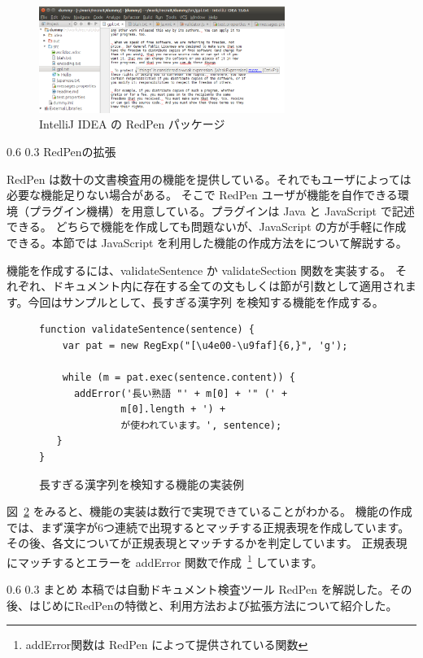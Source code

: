 \documentclass[a4j,twocolumn]{jarticle}
\makeatletter
\def\section{\@startsection{section}{1}{\z@}%
   {0.6\Cvs}%
   {0.3\Cvs}%
   {\reset@font\fontsize{10.5pt}{0pt}\bfseries}}
\makeatother
\begin{document}
\begin{figure}[thbp]
  \begin{center}
    \includegraphics[width=8cm]{figs/intellij.eps}
  \end{center}
  \caption{IntelliJ IDEA の RedPen パッケージ}
  \label{fig:intellij-idea}
\end{figure}  

\section{RedPenの拡張}
\label{sec:extension}

RedPen は数十の文書検査用の機能を提供している。それでもユーザによっては必要な機能足りない場合がある。
そこで RedPen ユーザが機能を自作できる環境（プラグイン機構）を用意している。プラグインは Java と JavaScript で記述できる。
どちらで機能を作成しても問題ないが、JavaScript の方が手軽に作成できる。本節では JavaScript を利用した機能の作成方法をについて解説する。

機能を作成するには、validateSentence か validateSection 関数を実装する。
それぞれ、ドキュメント内に存在する全ての文もしくは節が引数として適用されます。今回はサンプルとして、長すぎる漢字列
を検知する機能を作成する。

\begin{figure}
  \scriptsize
  \small
  \begin{verbatim}
function validateSentence(sentence) {
    var pat = new RegExp("[\u4e00-\u9faf]{6,}", 'g');

    while (m = pat.exec(sentence.content)) {
      addError('長い熟語 "' + m[0] + '" (' +
              m[0].length + ') +
              が使われています。', sentence);
   }
}
  \end{verbatim}
  \normalsize
  \caption{長すぎる漢字列を検知する機能の実装例}
  \label{fig:js-validator}
\end{figure}

図~\ref{fig:js-validator} をみると、機能の実装は数行で実現できていることがわかる。
機能の作成では、まず漢字が6つ連続で出現するとマッチする正規表現を作成しています。
その後、各文についてが正規表現とマッチするかを判定しています。
正規表現にマッチするとエラーを addError 関数で作成~\footnote{addError関数は RedPen によって提供されている関数} しています。

\section{まとめ}
本稿では自動ドキュメント検査ツール RedPen を解説した。その後、はじめにRedPenの特徴と、利用方法および拡張方法について紹介した。



\end{document}
